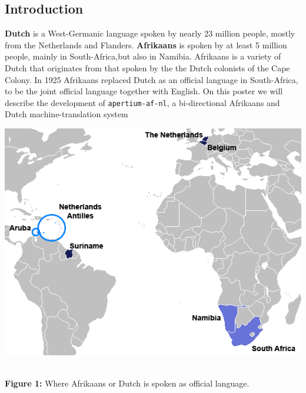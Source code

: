 \documentclass[a0,landscape]{a0poster}
\begin{document}
\begin{multicols}{4}

\newlength{\figwidth}
\setlength{\figwidth}{20cm}

\newlength{\fighalfwidth}
\setlength{\fighalfwidth}{10cm}


\section{Introduction}

\noindent
{\bf Dutch} is a West-Germanic language spoken by nearly 23 million people, mostly from the 
Netherlands and Flanders. {\bf Afrikaans} is spoken by at least 5 million people, mainly in 
South-Africa,but also in Namibia. Afrikaans is a variety of Dutch that originates from that 
spoken by the the Dutch colonists of the Cape Colony. In 1925 Afrikaans replaced Dutch as
an official language in South-Africa, to be the joint official language together with English.
On this poster we will describe the development of {\small {\tt apertium-af-nl}}, a bi-directional Afrikaans 
and Dutch machine-translation system

\begin{center}
\begin{minipage}[b]{26cm}
\includegraphics[width=260mm]{mapdutchworld.png}
\end{minipage}\\
\textbf{Figure 1:} Where Afrikaans or Dutch is spoken as official language.
\vspace{0.3cm}
\end{center}


\end{multicols}
\end{document}
